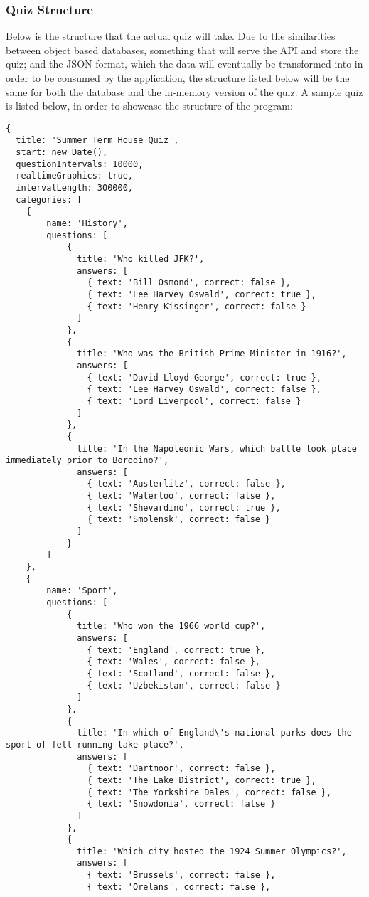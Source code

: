 \subsubsection{Quiz Structure}
Below is the structure that the actual quiz will take. Due to the similarities between object based databases, something that will serve the API and store the quiz; and the JSON format, which the data will eventually be transformed into in order to be consumed by the application, the structure listed below will be the same for both the database and the in-memory version of the quiz.
A sample quiz is listed below, in order to showcase the structure of the program:

\begin{verbatim}
{
  title: 'Summer Term House Quiz',
  start: new Date(),
  questionIntervals: 10000,
  realtimeGraphics: true,
  intervalLength: 300000,
  categories: [
  	{
  		name: 'History',
  		questions: [
  			{
  			  title: 'Who killed JFK?',
  			  answers: [
  			    { text: 'Bill Osmond', correct: false },
  			    { text: 'Lee Harvey Oswald', correct: true },
  			    { text: 'Henry Kissinger', correct: false }
  			  ]
  			},
  			{
  			  title: 'Who was the British Prime Minister in 1916?',
  			  answers: [
  			    { text: 'David Lloyd George', correct: true },
  			    { text: 'Lee Harvey Oswald', correct: false },
  			    { text: 'Lord Liverpool', correct: false }
  			  ]
  			},
  			{
  			  title: 'In the Napoleonic Wars, which battle took place immediately prior to Borodino?',
  			  answers: [
  			    { text: 'Austerlitz', correct: false },
  			    { text: 'Waterloo', correct: false },
  			    { text: 'Shevardino', correct: true },
  			    { text: 'Smolensk', correct: false }
  			  ]
  			}
  		]
  	},
  	{
  		name: 'Sport',
  		questions: [
  			{
  			  title: 'Who won the 1966 world cup?',
  			  answers: [
  			    { text: 'England', correct: true },
  			    { text: 'Wales', correct: false },
  			    { text: 'Scotland', correct: false },
  			    { text: 'Uzbekistan', correct: false }
  			  ]
  			},
  			{
  			  title: 'In which of England\'s national parks does the sport of fell running take place?',
  			  answers: [
  			    { text: 'Dartmoor', correct: false },
  			    { text: 'The Lake District', correct: true },
  			    { text: 'The Yorkshire Dales', correct: false },
  			    { text: 'Snowdonia', correct: false }
  			  ]
  			},
  			{
  			  title: 'Which city hosted the 1924 Summer Olympics?',
  			  answers: [
  			    { text: 'Brussels', correct: false },
  			    { text: 'Orelans', correct: false },

\end{verbatim}
